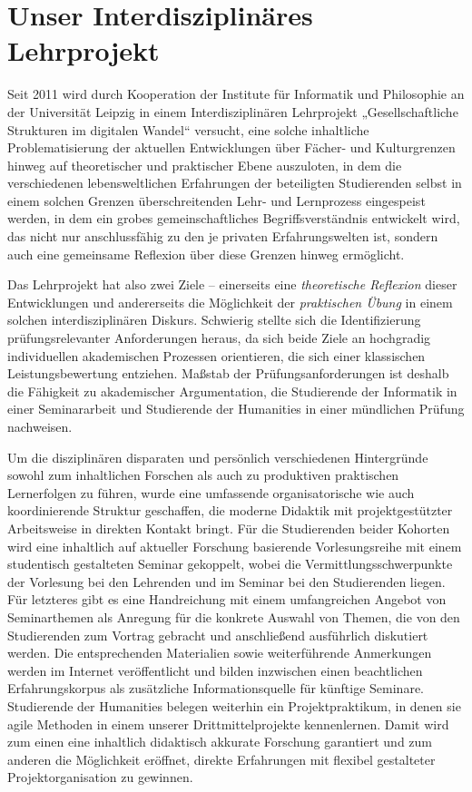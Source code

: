 \documentclass[a4paper,11pt]{article}
\begin{document}
\section*{Unser Interdisziplinäres Lehrprojekt}

Seit 2011 wird durch Kooperation der Institute für Informatik und Philosophie
an der Universität Leipzig in einem Interdisziplinären Lehrprojekt
„Gesellschaftliche Strukturen im digitalen Wandel“ versucht, eine solche
inhaltliche Problematisierung der aktuellen Entwicklungen über Fächer- und
Kulturgrenzen hinweg auf theoretischer und praktischer Ebene auszuloten, in
dem die verschiedenen lebensweltlichen Erfahrungen der beteiligten
Studierenden selbst in einem solchen Grenzen überschreitenden Lehr- und
Lernprozess eingespeist werden, in dem ein grobes gemeinschaftliches
Begriffsverständnis entwickelt wird, das nicht nur anschlussfähig zu den je
privaten Erfahrungswelten ist, sondern auch eine gemeinsame Reflexion über
diese Grenzen hinweg ermöglicht.

Das Lehrprojekt hat also zwei Ziele – einerseits eine \emph{theoretische
  Reflexion} dieser Entwicklungen und andererseits die Möglichkeit der
\emph{praktischen Übung} in einem solchen interdisziplinären Diskurs.
Schwierig stellte sich die Identifizierung prüfungsrelevanter Anforderungen
heraus, da sich beide Ziele an hochgradig individuellen akademischen Prozessen
orientieren, die sich einer klassischen Leistungsbewertung entziehen. Maßstab
der Prüfungsanforderungen ist deshalb die Fähigkeit zu akademischer
Argumentation, die Studierende der Informatik in einer Seminararbeit und
Studierende der Humanities in einer mündlichen Prüfung nachweisen.

Um die disziplinären disparaten und persönlich verschiedenen Hintergründe
sowohl zum inhaltlichen Forschen als auch zu produktiven praktischen
Lernerfolgen zu führen, wurde eine umfassende organisatorische wie auch
koordinierende Struktur geschaffen, die moderne Didaktik mit projektgestützter
Arbeitsweise in direkten Kontakt bringt. Für die Studierenden beider Kohorten
wird eine inhaltlich auf aktueller Forschung basierende Vorlesungsreihe mit
einem studentisch gestalteten Seminar gekoppelt, wobei die
Vermittlungsschwerpunkte der Vorlesung bei den Lehrenden und im Seminar bei
den Studierenden liegen. Für letzteres gibt es eine Handreichung mit einem
umfangreichen Angebot von Seminarthemen als Anregung für die konkrete Auswahl
von Themen, die von den Studierenden zum Vortrag gebracht und anschließend
ausführlich diskutiert werden. Die entsprechenden Materialien sowie
weiterführende Anmerkungen werden im Internet veröffentlicht und bilden
inzwischen einen beachtlichen Erfahrungskorpus als zusätzliche
Informationsquelle für künftige Seminare. Studierende der Humanities belegen
weiterhin ein Projektpraktikum, in denen sie agile Methoden in einem unserer
Drittmittelprojekte kennenlernen. Damit wird zum einen eine inhaltlich
didaktisch akkurate Forschung garantiert und zum anderen die Möglichkeit
eröffnet, direkte Erfahrungen mit flexibel gestalteter Projektorganisation zu
gewinnen.
\end{document}
